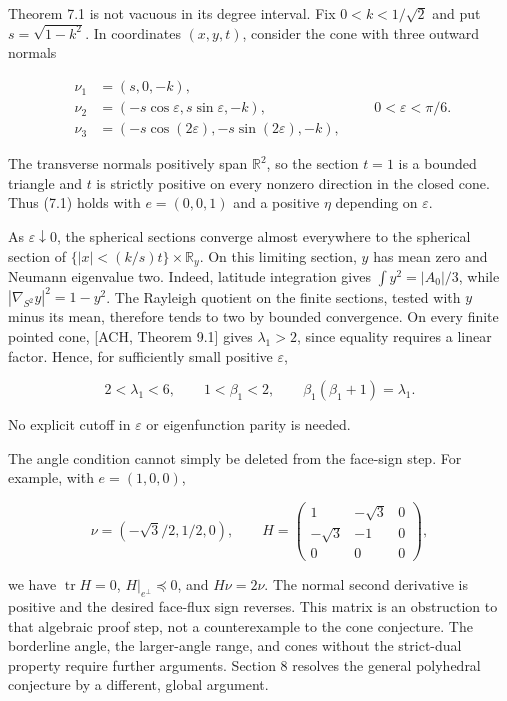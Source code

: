 \documentclass[11pt]{article}
\begin{document}
Theorem 7.1 is not vacuous in its degree interval. Fix \(0<k<1/\sqrt2\)
and put \(s=\sqrt{1-k^2}\). In coordinates \((x,y,t)\), consider the
cone with three outward normals

\[
\begin{aligned}
\nu_1&=(s,0,-k),\\
\nu_2&=(-s\cos\varepsilon,s\sin\varepsilon,-k),\\
\nu_3&=(-s\cos(2\varepsilon),-s\sin(2\varepsilon),-k),
\end{aligned}
\qquad 0<\varepsilon<\pi/6.
\tag{7.14}
\]

The transverse normals positively span \(\mathbb R^2\), so the section
\(t=1\) is a bounded triangle and \(t\) is strictly positive on every
nonzero direction in the closed cone. Thus (7.1) holds with
\(e=(0,0,1)\) and a positive \(\eta\) depending on \(\varepsilon\).

As \(\varepsilon\downarrow0\), the spherical sections converge almost
everywhere to the spherical section of
\(\{|x|<(k/s)t\}\times\mathbb R_y\). On this limiting section, \(y\) has
mean zero and Neumann eigenvalue two. Indeed, latitude integration gives
\(\int y^2=|A_0|/3\), while \(|\nabla_{S^2}y|^2=1-y^2\). The Rayleigh
quotient on the finite sections, tested with \(y\) minus its mean,
therefore tends to two by bounded convergence. On every finite pointed
cone, {[}ACH, Theorem 9.1{]} gives \(\lambda_1>2\), since equality
requires a linear factor. Hence, for sufficiently small positive
\(\varepsilon\),

\[
2<\lambda_1<6,\qquad
1<\beta_1<2,\qquad \beta_1(\beta_1+1)=\lambda_1.
\tag{7.15}
\]

No explicit cutoff in \(\varepsilon\) or eigenfunction parity is needed.

The angle condition cannot simply be deleted from the face-sign step.
For example, with \(e=(1,0,0)\),

\[
\nu=(-\sqrt3/2,1/2,0),\qquad
H=\begin{pmatrix}1&-\sqrt3&0\\-\sqrt3&-1&0\\0&0&0\end{pmatrix},
\tag{7.16}
\]

we have \(\operatorname{tr}H=0\), \(H|_{e^\perp}\preceq0\), and
\(H\nu=2\nu\). The normal second derivative is positive and the desired
face-flux sign reverses. This matrix is an obstruction to that algebraic
proof step, not a counterexample to the cone conjecture. The borderline
angle, the larger-angle range, and cones without the strict-dual
property require further arguments. Section 8 resolves the general
polyhedral conjecture by a different, global argument.
\end{document}
